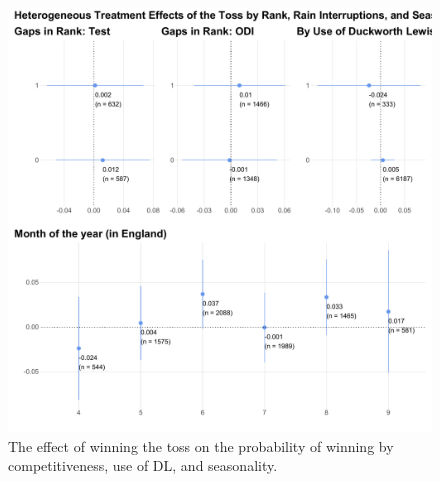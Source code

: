 \documentclass[12pt, letterpaper]{article}
\begin{document}
\begin{figure}[b]
  \centering
  \includegraphics[scale=.5]{output/reduced_form_by_rank_dl_season.pdf}
  \caption{The effect of winning the toss on the probability of winning by competitiveness, use of DL, and seasonality.}
  \label{fig:rf_het_TE3}
\end{figure}

\clearpage
\end{document}
